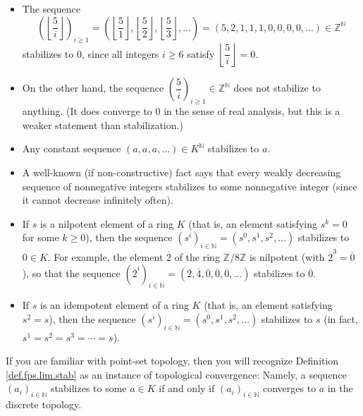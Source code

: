 \begin{itemize}
\item The sequence%
\[
\left(  \left\lfloor \dfrac{5}{i}\right\rfloor \right)  _{i\geq1}=\left(
\left\lfloor \dfrac{5}{1}\right\rfloor ,\left\lfloor \dfrac{5}{2}\right\rfloor
,\left\lfloor \dfrac{5}{3}\right\rfloor ,\ldots\right)  =\left(
5,2,1,1,1,0,0,0,0,\ldots\right)  \in\mathbb{Z}^{\mathbb{N}}%
\]
stabilizes to $0$, since all integers $i\geq6$ satisfy $\left\lfloor \dfrac
{5}{i}\right\rfloor =0$.

\item On the other hand, the sequence $\left(  \dfrac{5}{i}\right)  _{i\geq
1}\in\mathbb{Z}^{\mathbb{N}}$ does not stabilize to anything. (It does
converge to $0$ in the sense of real analysis, but this is a weaker statement
than stabilization.)

\item Any constant sequence $\left(  a,a,a,\ldots\right)  \in K^{\mathbb{N}}$
stabilizes to $a$.

\item A well-known (if non-constructive) fact says that every weakly
decreasing sequence of nonnegative integers stabilizes to some nonnegative
integer (since it cannot decrease infinitely often).

\item If $s$ is a nilpotent element of a ring $K$ (that is, an element
satisfying $s^{k}=0$ for some $k\geq0$), then the sequence $\left(
s^{i}\right)  _{i\in\mathbb{N}}=\left(  s^{0},s^{1},s^{2},\ldots\right)  $
stabilizes to $0\in K$. For example, the element $\overline{2}$ of the ring
$\mathbb{Z}/8\mathbb{Z}$ is nilpotent (with $\overline{2}^{3}=\overline{0}$),
so that the sequence $\left(  \overline{2}^{i}\right)  _{i\in\mathbb{N}%
}=\left(  \overline{2},\overline{4},\overline{0},\overline{0},\overline
{0},\ldots\right)  $ stabilizes to $\overline{0}$.

\item If $s$ is an idempotent element of a ring $K$ (that is, an element
satisfying $s^{2}=s$), then the sequence $\left(  s^{i}\right)  _{i\in
\mathbb{N}}=\left(  s^{0},s^{1},s^{2},\ldots\right)  $ stabilizes to $s$ (in
fact, $s^{1}=s^{2}=s^{3}=\cdots=s$).
\end{itemize}

\begin{remark}
If you are familiar with point-set topology, then you will recognize
Definition \ref{def.fps.lim.stab} as an instance of topological convergence:
Namely, a sequence $\left(  a_{i}\right)  _{i\in\mathbb{N}}$ stabilizes to
some $a\in K$ if and only if $\left(  a_{i}\right)  _{i\in\mathbb{N}}$
converges to $a$ in the discrete topology.
\end{remark}


